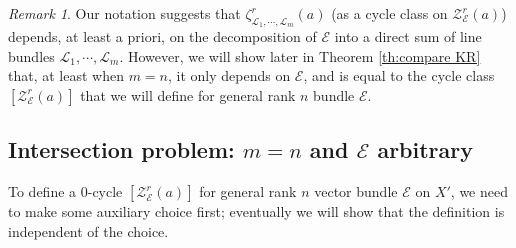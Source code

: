 \documentclass[reqno]{amsart}
\numberwithin{equation}{section}
\newcommand{\tony}[1]{{\color{blue} \sf
    $\spadesuit\spadesuit\spadesuit$ TONY: [#1]}}
\newcommand\mnote[1]{\marginpar{\tiny #1}}
\newcommand{\Cal}[1]{\mathcal{#1}}
\DeclareMathOperator{\Ch}{Ch}
\newcommand{\KR}[1]{\Cal{Z}_{\Cal{#1}}}
\newcommand{\z}{\zeta}
\newcommand\cE{\mathcal{E}}
\newcommand\cL{\mathcal{L}}
\newcommand\cZ{\mathcal{Z}}
\theoremstyle{remark}
\newtheorem{remark}[thm]{Remark}
\numberwithin{equation}{section}
\begin{document}
\begin{remark} Our notation suggests that $\z^{r}_{\cL_{1},\cdots, \cL_{m}}(a)$ (as a cycle class on $\cZ_{\cE}^{r}(a)$) depends, at least a priori, on the decomposition of $\cE$ into a direct sum of line bundles $\cL_{1},\cdots, \cL_{m}$.  However, we will show later in Theorem \ref{th:compare KR}  that, at least when $m=n$, it only depends on $\cE$, and is equal to the cycle class $[\cZ^{r}_{\cE}(a)]$ that we will define for general rank $n$ bundle $\cE$.
\end{remark}




	

\subsection{Intersection problem: $m=n$ and $\cE$ arbitrary}\label{ssec: intersection problem}





To define a $0$-cycle $[\KR{E}^r(a)] $ for general rank $n$ vector bundle $\Cal{E}$ on $X'$, we need to make some auxiliary choice first; eventually we will show that the definition is independent of the choice.
\end{document}
